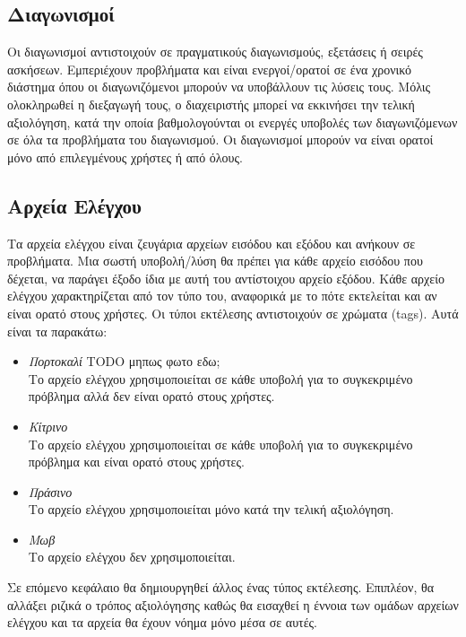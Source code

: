 \documentclass[diploma]{softlab-thesis}
\begin{document}
\subsection{Διαγωνισμοί}

Οι διαγωνισμοί αντιστοιχούν σε πραγματικούς διαγωνισμούς, εξετάσεις ή σειρές
ασκήσεων. Εμπεριέχουν προβλήματα και είναι ενεργοί/ορατοί σε ένα χρονικό
διάστημα όπου οι διαγωνιζόμενοι μπορούν να υποβάλλουν τις λύσεις τους. Μόλις
ολοκληρωθεί η διεξαγωγή τους, ο διαχειριστής μπορεί να εκκινήσει την τελική
αξιολόγηση, κατά την οποία βαθμολογούνται οι ενεργές υποβολές των
διαγωνιζόμενων σε όλα τα προβλήματα του διαγωνισμού. Οι διαγωνισμοί μπορούν να
είναι ορατοί μόνο από επιλεγμένους χρήστες ή από όλους.

\subsection{Αρχεία Ελέγχου}

Τα αρχεία ελέγχου είναι ζευγάρια αρχείων εισόδου και εξόδου και ανήκουν σε
προβλήματα. Μια σωστή υποβολή/λύση θα πρέπει για κάθε αρχείο εισόδου
που δέχεται, να παράγει έξοδο ίδια με αυτή του αντίστοιχου αρχείο εξόδου.
Κάθε αρχείο ελέγχου χαρακτηρίζεται από τον τύπο του, αναφορικά με το πότε
εκτελείται και αν είναι ορατό στους χρήστες. Οι τύποι εκτέλεσης αντιστοιχούν
σε χρώματα (tags). Αυτά είναι τα παρακάτω:

\begin{itemize}
  \item \textit{Πορτοκαλί} TODO μηπως φωτο εδω; \\
      Το αρχείο ελέγχου χρησιμοποιείται σε κάθε υποβολή για το συγκεκριμένο πρόβλημα
      αλλά δεν είναι ορατό στους χρήστες.
    \item \textit{Κίτρινο} \\
      Το αρχείο ελέγχου χρησιμοποιείται σε κάθε υποβολή για το συγκεκριμένο πρόβλημα
      και είναι ορατό στους χρήστες.
    \item \textit{Πράσινο} \\
      Το αρχείο ελέγχου χρησιμοποιείται μόνο κατά την τελική αξιολόγηση.
    \item \textit{Μωβ} \\
      Το αρχείο ελέγχου δεν χρησιμοποιείται.
\end{itemize}

Σε επόμενο κεφάλαιο θα δημιουργηθεί άλλος ένας τύπος εκτέλεσης. Επιπλέον, θα
αλλάξει ριζικά ο τρόπος αξιολόγησης καθώς θα εισαχθεί η έννοια των ομάδων
αρχείων ελέγχου και τα αρχεία θα έχουν νόημα μόνο μέσα σε αυτές.
\end{document}
